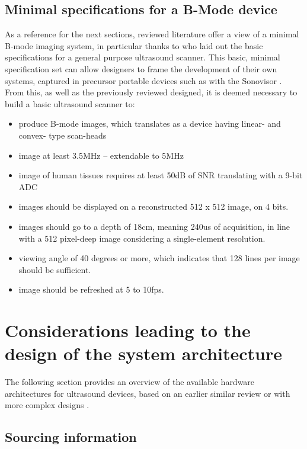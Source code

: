 \documentclass{article}
\begin{document}
\subsection{Minimal specifications for a B-Mode device}

As a reference for the next sections, reviewed literature offer a view of a minimal B-mode imaging system, in particular thanks to \cite{kurjak_use_1986} who laid out the basic specifications for a general purpose ultrasound scanner. This basic, minimal specification set can allow designers to frame the development of their own systems, captured in precursor portable devices such as with the Sonovisor \cite{zeiss_sonovisor_1962}. From this, as well as the previously reviewed designed, it is deemed necessary to build a basic ultrasound scanner to:

\begin{itemize}
\item produce B-mode images, which translates as a device having linear- and convex- type scan-heads
\item image at least 3.5MHz -- extendable to 5MHz
\item image of human tissues requires at least 50dB of SNR \cite{attarzadeh_low-power_2017} translating with a 9-bit ADC 
\item images should be displayed on a reconstructed 512 x 512 image, on 4 bits.
\item images should go to a depth of 18cm, meaning 240us of acquisition, in line with a 512 pixel-deep image considering a single-element resolution. 
\item viewing angle of 40 degrees or more, which indicates that 128 lines per image should be sufficient.
\item image should be refreshed at 5 to 10fps.
\end{itemize}

\newpage
\section{Considerations leading to the design of the system architecture}

The following section provides an overview of the available hardware architectures for ultrasound devices, based on an earlier similar review \cite{jonveaux_arduino-like_2017} or with more complex designs \cite{roman_open-source_2019}.

\subsection{Sourcing information }
\end{document}

